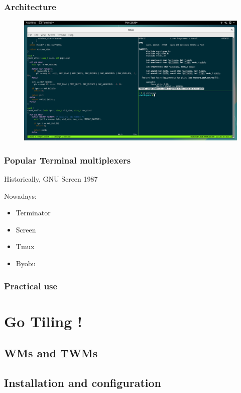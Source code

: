 \documentclass[aspectratio=169]{beamer}
\begin{document}
\begin{frame}
  \frametitle{Architecture}
    \begin{figure}[h]
        \includegraphics[scale=0.23]{./images/tmux_visual.png}
    \end{figure}
\end{frame}

\begin{frame}
  \frametitle{Popular Terminal multiplexers}
    Historically, GNU Screen 1987 \newline

    Nowadays:
    \begin{itemize}
      \item Terminator
      \item Screen
      \item Tmux
      \item Byobu
    \end{itemize}
\end{frame}

\begin{frame}
  \frametitle{Practical use}
    \begin{center}
    \end{center}
\end{frame}


\section{Go Tiling !}
\subsection{WMs and TWMs}
\subsection{Installation and configuration}
\end{document}
